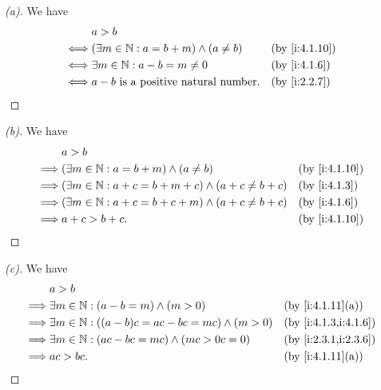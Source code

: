 \begin{proof}[(a)]
  We have
  \begin{align*}
         & a > b                                                              \\
    \iff & (\exists m \in \N : a = b + m) \land (a \neq b) &  & \by{i:4.1.10} \\
    \iff & \exists m \in \N : a - b = m \neq 0             &  & \by{i:4.1.6}  \\
    \iff & a - b \text{ is a positive natural number}.     &  & \by{i:2.2.7}
  \end{align*}
\end{proof}

\begin{proof}[(b)]
  We have
  \begin{align*}
             & a > b                                                                              \\
    \implies & (\exists m \in \N : a = b + m) \land (a \neq b)                 &  & \by{i:4.1.10} \\
    \implies & (\exists m \in \N : a + c = b + m + c) \land (a + c \neq b + c) &  & \by{i:4.1.3}  \\
    \implies & (\exists m \in \N : a + c = b + c + m) \land (a + c \neq b + c) &  & \by{i:4.1.6}  \\
    \implies & a + c > b + c.                                                  &  & \by{i:4.1.10}
  \end{align*}
\end{proof}

\begin{proof}[(c)]
  We have
  \begin{align*}
             & a > b                                                                                \\
    \implies & \exists m \in \N : (a - b = m) \land (m > 0)               &  & \by{i:4.1.11}[a]     \\
    \implies & \exists m \in \N : ((a - b)c = ac - bc = mc) \land (m > 0) &  & \by{i:4.1.3,i:4.1.6} \\
    \implies & \exists m \in \N : (ac - bc = mc) \land (mc > 0c = 0)      &  & \by{i:2.3.1,i:2.3.6} \\
    \implies & ac > bc.                                                   &  & \by{i:4.1.11}[a]
  \end{align*}
\end{proof}

